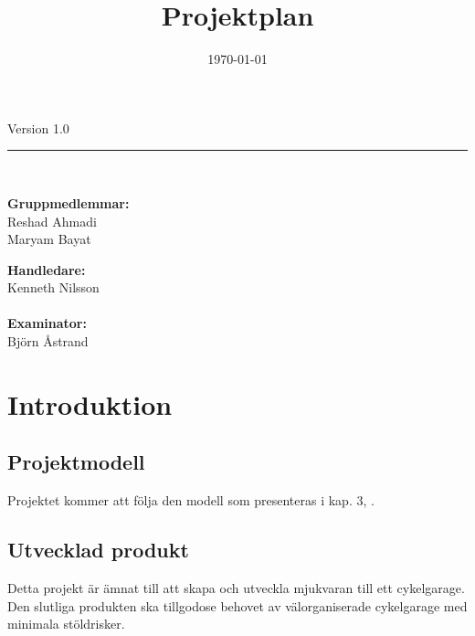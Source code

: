 \documentclass[a4paper]{article}
\title{Projektplan}
\date{\today}
\begin{document}
\maketitle

\begin{center}

\large{Version 1.0}   			%
\ \\[1cm]
\hrule
\ \\[1cm]
\begin{minipage}{0.5\textwidth}
	\begin{flushleft} \large
		\textbf{Gruppmedlemmar:} \\
		Reshad Ahmadi \\
		Maryam Bayat \\		
	\end{flushleft}
\end{minipage}

\begin{minipage}{0.4\textwidth}
	\begin{flushright} \large
		\textbf{Handledare:} \\
		Kenneth Nilsson \\
		\ \\				
		\textbf{Examinator:} \\
		Björn Åstrand
	\end{flushright}
\end{minipage}

\end{center}

\clearpage

\tableofcontents
\newpage

\section{Introduktion}


\subsection{Projektmodell} %
Projektet kommer att följa den modell som presenteras i kap. 3, \cite{engproc}.

\subsection{Utvecklad produkt} %
Detta projekt är ämnat till att skapa och utveckla mjukvaran till ett cykelgarage. Den slutliga produkten ska
 tillgodose behovet av välorganiserade cykelgarage med minimala stöldrisker.
\end{document}
